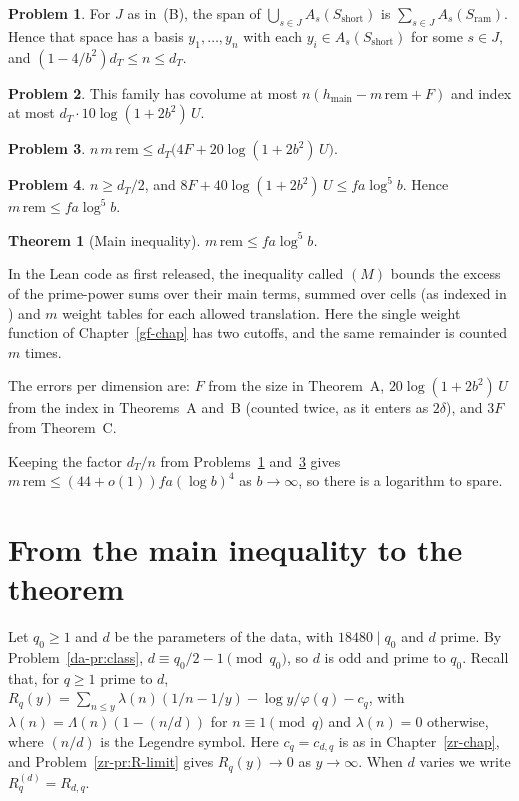 \documentclass[reqno]{amsart}
\newcounter{chap}
\theoremstyle{definition}
\newtheorem{problem}{Problem}[section]
\theoremstyle{plain}
\newtheorem{theorem}{Theorem}[section]
\newcommand{\main}{h_{\mathrm{main}}}
\newcommand{\rem}{\mathrm{rem}}
\begin{document}
\begin{problem}\label{pr:family}
For \(J\) as in~(B), the span of \(\bigcup_{s \in J} A_s(S_{\mathrm{short}})\) is \(\sum_{s \in J} A_s(S_{\mathrm{ram}})\).  Hence that space has a basis \(y_1, \dots, y_n\) with each \(y_i \in A_s(S_{\mathrm{short}})\) for some \(s \in J\), and \((1 - 4/b^2)d_T \le n \le d_T\).
\end{problem}

\begin{problem}\label{pr:upper}
This family has covolume at most \(n(\main - m\,\rem + F)\) and index at most \(d_T \cdot 10\log(1 + 2b^2)\, U\).
\end{problem}

\begin{problem}\label{pr:compare}
\(n\, m\,\rem \le d_T\bigl(4F + 20\log(1 + 2b^2)\,U\bigr)\).
\end{problem}

\begin{problem}\label{pr:errors}
\(n \ge d_T/2\), and \(8F + 40\log(1 + 2b^2)\, U \le fa\log^5 b\).  Hence \(m\,\rem \le fa\log^5 b\).
\end{problem}

\begin{theorem}[Main inequality]\label{thm:main}
\(m\,\rem \le fa\log^5 b\).
\end{theorem}

In the Lean code as first released, the inequality called \((M)\) bounds the excess of the prime-power sums over their main terms, summed over cells (as indexed in \cite[\S8.1]{Nas}) and \(m\) weight tables for each allowed translation.  Here the single weight function of Chapter~\ref{gf-chap} has two cutoffs, and the same remainder is counted \(m\) times.

The errors per dimension are: \(F\) from the size in Theorem~A, \(20\log(1 + 2b^2)\,U\) from the index in Theorems~A and~B (counted twice, as it enters as \(2\delta\)), and \(3F\) from Theorem~C.

Keeping the factor \(d_T/n\) from Problems~\ref{pr:family} and~\ref{pr:compare} gives \(m\,\rem \le (44 + o(1))fa(\log b)^4\) as \(b \to \infty\), so there is a logarithm to spare.

\section{From the main inequality to the theorem}\label{sec:end}

Let \(q_0 \ge 1\) and \(d\) be the parameters of the data, with \(18480 \mid q_0\) and \(d\) prime.  By Problem~\ref{da-pr:class}, \(d \equiv q_0/2 - 1 \pmod{q_0}\), so \(d\) is odd and prime to \(q_0\).  Recall that, for \(q \ge 1\) prime to \(d\), \(R_q(y) = \sum_{n \le y} \lambda(n)(1/n - 1/y) - \log y/\varphi(q) - c_q\), with \(\lambda(n) = \Lambda(n)(1 - (n/d))\) for \(n \equiv 1 \pmod q\) and \(\lambda(n) = 0\) otherwise, where \((n/d)\) is the Legendre symbol.  Here \(c_q = c_{d,q}\) is as in Chapter~\ref{zr-chap}, and Problem~\ref{zr-pr:R-limit} gives \(R_q(y) \to 0\) as \(y \to \infty\).  When \(d\) varies we write \(R_q^{(d)} = R_{d,q}\).
\end{document}
